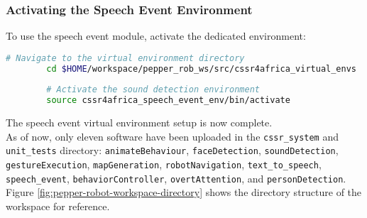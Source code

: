 \documentclass{CSSRforAfrica}
\begin{document}
{		\subsubsection*{Activating the Speech Event Environment}
		To use the speech event module, activate the dedicated environment:
		\begin{lstlisting}[style=withoutNumbering, language=bash]
		# Navigate to the virtual environment directory
		cd $HOME/workspace/pepper_rob_ws/src/cssr4africa_virtual_envs
		
		# Activate the sound detection environment
		source cssr4africa_speech_event_env/bin/activate
		\end{lstlisting} 
		
		\noindent The speech event virtual environment setup is now complete. \\
		
		
		
		\noindent As of now, only eleven software have been uploaded in the \texttt{cssr\_system} and \texttt{unit\_tests} directory: \texttt{animateBehaviour}, \texttt{faceDetection}, \texttt{soundDetection}, \texttt{gestureExecution}, \texttt{mapGeneration}, \texttt{robotNavigation}, \texttt{text\_to\_speech}, \texttt{speech\_event}, \texttt{behaviorController}, \texttt{overtAttention}, and \texttt{personDetection}. \\
		
		\newpage
		\noindent Figure \ref{fig:pepper-robot-workspace-directory} shows the directory structure of the workspace for reference.
		\begin{figure}[H]
			
			{\small 
			}
			

\end{figure}}
\end{document}
